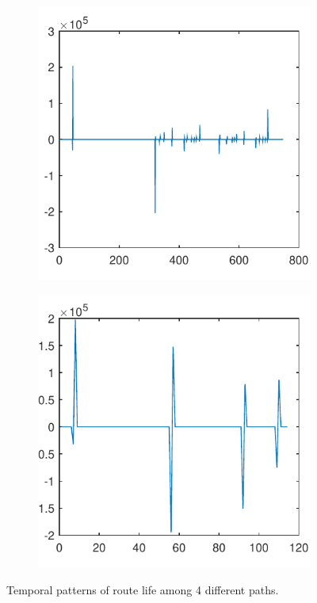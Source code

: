\documentclass[sigconf]{acmart}
\begin{document}
\begin{figure}[tp]
\begin{subfigure}[t]{0.45\linewidth}
			\label{fig:3.1b}
		\end{subfigure}
		\begin{subfigure}[t]{0.45\linewidth}
			\centering
			\includegraphics[width=0.95\linewidth]{fig/total_life_21}
			\label{fig:3.1c}
		\end{subfigure}
		\begin{subfigure}[t]{0.45\linewidth}
			\centering
			\includegraphics[width=0.95\linewidth]{fig/total_life_30}
			\label{fig:3.1d}
		\end{subfigure}
		\caption{Temporal patterns of route life among 4 different paths.}
		\label{fig:3.1}
	\end{figure}
	
\end{document}
